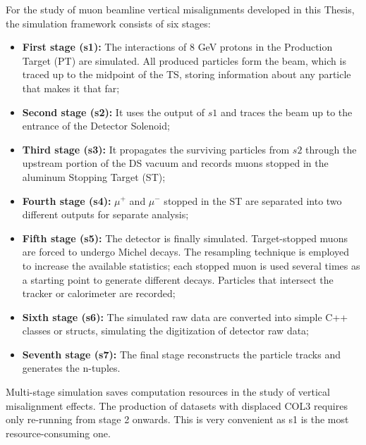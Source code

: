 For the study of muon beamline vertical misalignments developed in this Thesis, the simulation 
framework consists of six stages:

\begin{itemize}
    \item \textbf{First stage (s1):} The interactions of 8 GeV protons in the Production Target (PT) 
    are simulated. All produced particles form the beam, which is traced up to the midpoint of the TS, 
    storing information about any particle that makes it that far;
    \item \textbf{Second stage (s2):} It uses the output of $s1$ and traces the beam up to the entrance 
    of the Detector Solenoid;
    \item \textbf{Third stage (s3):} It propagates the surviving particles from $s2$ through the 
    upstream portion of the DS vacuum and records muons stopped in the aluminum 
    Stopping Target (ST);
    \item \textbf{Fourth stage (s4):} $\mu^+$ and $\mu^-$ stopped in the ST are separated into two 
    different outputs for separate analysis;
    \item \textbf{Fifth stage (s5):} The detector is finally simulated. Target-stopped muons are 
    forced to undergo Michel decays. The resampling technique is employed to increase the available 
    statistics; each stopped muon is used several times as a starting point to generate different 
    decays. Particles that intersect the tracker or calorimeter are recorded;
    \item \textbf{Sixth stage (s6):} The simulated raw data are converted into simple C++ classes 
    or structs, simulating the digitization of detector raw data;
    \item \textbf{Seventh stage (s7):} The final stage reconstructs the particle tracks and 
    generates the n-tuples.
\end{itemize}

Multi-stage simulation saves computation resources in the study of vertical misalignment 
effects. The production of datasets with displaced COL3 requires only re-running from stage 
2 onwards. This is very convenient as s1 is the most resource-consuming one.
